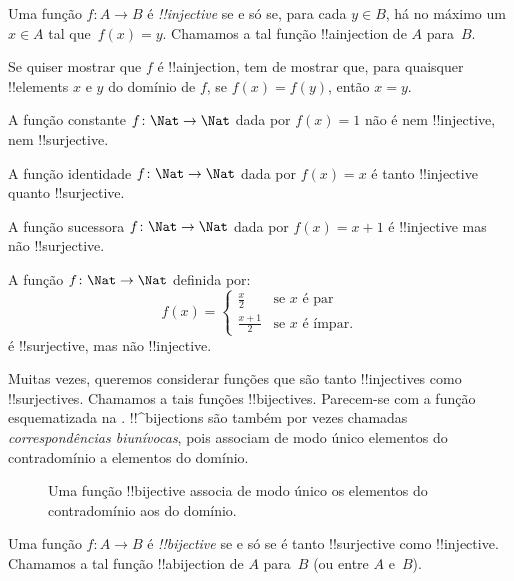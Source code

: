 \documentclass[../../../include/open-logic-section]{subfiles}
\begin{document}
\begin{defn}
Uma função $f \colon A \rightarrow B$ é \emph{!!{injective}} se e só se, para
cada $y \in B$, há no máximo um $x \in A$ tal que~$f(x) = y$. Chamamos a
tal função !!a{injection} de $A$ para~$B$.
\end{defn}

\begin{explain}
Se quiser mostrar que $f$ é !!a{injection}, tem de mostrar que,
para quaisquer !!{element}s $x$ e $y$ do domínio de $f$, se $f(x)=f(y)$, então
$x=y$.
\end{explain}

\begin{ex}
A função constante $f\colon \Nat \to \Nat$ dada por $f(x) = 1$ não é
nem !!{injective}, nem !!{surjective}.

A função identidade $f\colon \Nat \to \Nat$ dada por $f(x) = x$ é
tanto !!{injective} quanto !!{surjective}.

A função sucessora $f \colon \Nat \to \Nat$ dada por $f(x) = x+1$
é !!{injective} mas não !!{surjective}.

A função $f \colon \Nat \to \Nat$ definida por:
\[
  f(x) =
  \begin{cases}
    \frac{x}{2} & \text{se $x$ é par} \\
    \frac{x+1}{2} & \text{se $x$ é ímpar.}
  \end{cases}
\]
é !!{surjective}, mas não !!{injective}.
\end{ex}

\begin{explain}
Muitas vezes, queremos considerar funções que são tanto
!!{injective}s como !!{surjective}s. Chamamos a tais funções
!!{bijective}s. Parecem-se com a função esquematizada na
. !!^{bijection}s são também por vezes chamadas
\emph{correspondências biunívocas}, pois associam de modo único elementos
do contradomínio a elementos do domínio.
\begin{figure}[H]
  \caption{Uma função !!{bijective} associa de modo único os elementos do
    contradomínio aos do domínio.}
\end{figure}
\end{explain}

\begin{defn}[!!^{bijection}]
Uma função $f \colon A \to B$ é \emph{!!{bijective}} se e só se é tanto
!!{surjective} como !!{injective}. Chamamos a tal função
!!a{bijection} de $A$ para~$B$ (ou entre $A$ e~$B$).
\end{defn}
\end{document}
